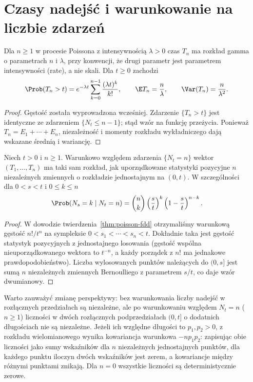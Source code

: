 \section{Czasy nadejść i warunkowanie na liczbie zdarzeń}
\begin{twierdzenie}
Dla $n\ge1$ w procesie Poissona z intensywnością $\lambda>0$
czas $T_n$ ma rozkład gamma o parametrach $n$ i $\lambda$,
przy konwencji, że drugi parametr jest parametrem
intensywności (rate), a nie skali. Dla $t\ge0$ zachodzi
\[
\Prob(T_n>t)=e^{-\lambda t}\sum_{k=0}^{n-1}
\frac{(\lambda t)^k}{k!},\qquad
\E T_n=\frac n\lambda,\qquad \Var(T_n)=\frac n{\lambda^2}.
\]
\end{twierdzenie}
\begin{proof}
Gęstość została wyprowadzona wcześniej. Zdarzenie
$\{T_n>t\}$ jest identyczne ze zdarzeniem $\{N_t\le n-1\}$;
stąd wzór na funkcję przeżycia. Ponieważ
$T_n=E_1+\cdots+E_n$, niezależność i momenty rozkładu
wykładniczego dają wskazane średnią i wariancję.
\end{proof}

\begin{twierdzenie}
\label{thm:uniform-poisson-times}
Niech $t>0$ i $n\ge1$. Warunkowo względem zdarzenia
$\{N_t=n\}$ wektor $(T_1,\ldots,T_n)$ ma taki sam rozkład,
jak uporządkowane statystyki pozycyjne $n$ niezależnych
zmiennych o rozkładzie jednostajnym na $(0,t)$.
W szczególności dla $0<s<t$ i $0\le k\le n$
\[
\Prob(N_s=k\mid N_t=n)
=\binom nk\left(\frac{s}{t}\right)^k
\left(1-\frac{s}{t}\right)^{n-k}.
\]
\end{twierdzenie}
\begin{proof}
W dowodzie twierdzenia~\ref{thm:poisson-fdd} otrzymaliśmy
warunkową gęstość $n!/t^n$ na sympleksie
$0<s_1<\cdots<s_n<t$. Dokładnie taka jest gęstość
statystyk pozycyjnych z jednostajnego losowania
(gęstość wspólna nieuporządkowanego wektora to $t^{-n}$,
a każdy porządek z $n!$ ma jednakowe prawdopodobieństwo).
Liczba wylosowanych punktów należących do $(0,s]$ jest sumą
$n$ niezależnych zmiennych Bernoulliego z parametrem $s/t$,
co daje wzór dwumianowy.
\end{proof}

Warto zauważyć zmianę perspektywy: bez warunkowania liczby
nadejść w rozłącznych przedziałach są niezależne, ale
po warunkowaniu względem $N_t=n$ ($n\ge1$) liczności
w dwóch rozłącznych podprzedziałach $(0,t]$ o dodatnich
długościach nie są niezależne. Jeżeli ich względne długości
to $p_1,p_2>0$, z rozkładu wielomianowego wynika
kowariancja warunkowa $-np_1p_2$: zapisując obie liczności
jako sumy wskaźników dla $n$ niezależnych jednostajnych
punktów, dla każdego punktu iloczyn dwóch wskaźników jest
zerem, a kowariancje między różnymi punktami znikają.
Dla $n=0$ wszystkie liczności są deterministycznie zerowe.

